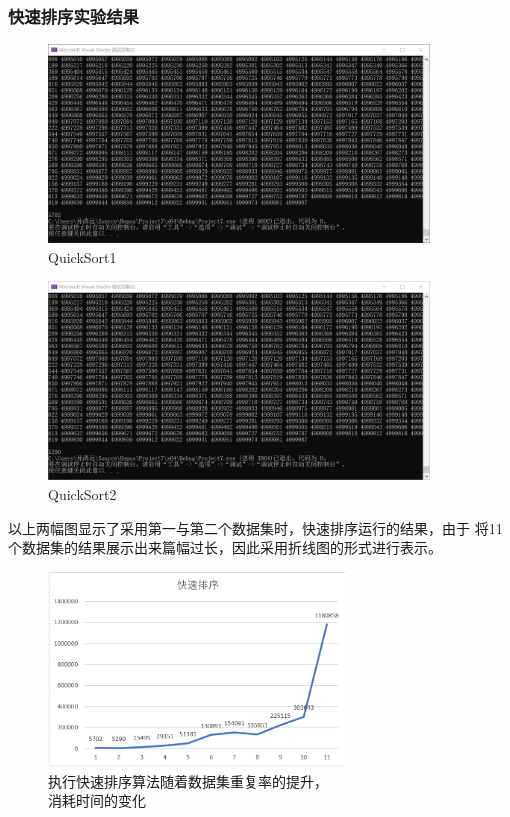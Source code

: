 \documentclass[UTF8]{ctexart}
\begin{document}
\subsubsection{快速排序实验结果}
\begin{figure}[H]
    \centering
    \includegraphics[width=0.9\textwidth]{quick0.png}
    \caption{QuickSort1}
\end{figure}
\begin{figure}[H]
    \centering
    \includegraphics[width=0.9\textwidth]{quick1.png}
    \caption{QuickSort2}
\end{figure}
以上两幅图显示了采用第一与第二个数据集时，快速排序运行的结果，由于
将11个数据集的结果展示出来篇幅过长，因此采用折线图的形式进行表示。\par
\begin{figure}[H]
    \centering
    \includegraphics[width=0.7\textwidth]{figure1.png}
    \caption{执行快速排序算法随着数据集重复率的提升，\\消耗时间的变化}
\end{figure}
\end{document}
